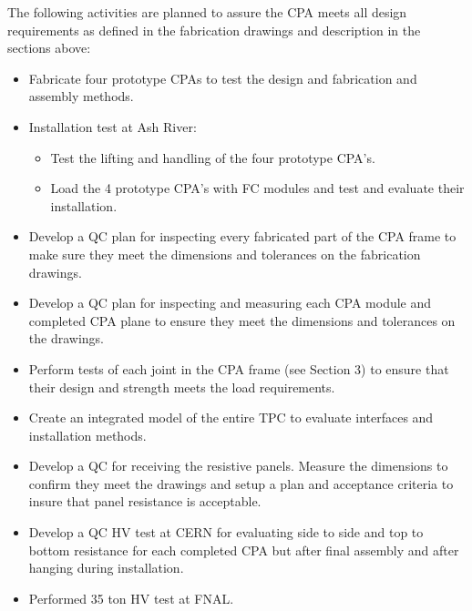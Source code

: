 The following activities are planned to assure the CPA meets all design requirements as defined in the fabrication drawings and description in the sections above:
\begin{itemize}
\item Fabricate four prototype CPAs to test the design and fabrication and assembly methods.
\item Installation test at Ash River:
\begin{itemize}
\item Test the lifting and handling of the four prototype CPA’s.
\item  Load the 4 prototype CPA’s with FC modules and test and evaluate their installation.
\end{itemize}
\item Develop a QC plan for inspecting every fabricated part of the CPA frame to make sure they meet the dimensions and tolerances on the fabrication drawings.
\item Develop a QC plan for inspecting and measuring each CPA module and completed CPA plane to ensure they meet the dimensions and tolerances on the drawings.
\item Perform tests of each joint in the CPA frame (see Section 3) to ensure that their design and strength meets the load requirements.
\item Create an integrated model of the entire TPC to evaluate interfaces and installation methods.  
\item Develop a QC for receiving the resistive panels.  Measure the dimensions to confirm they meet the drawings and setup a plan and acceptance criteria to insure that panel resistance is acceptable.
\item Develop a QC  HV test at CERN for evaluating side to side and top to bottom resistance for each completed CPA but after final assembly and after hanging during installation.  
\item Performed 35 ton HV test at FNAL.
\end{itemize}


